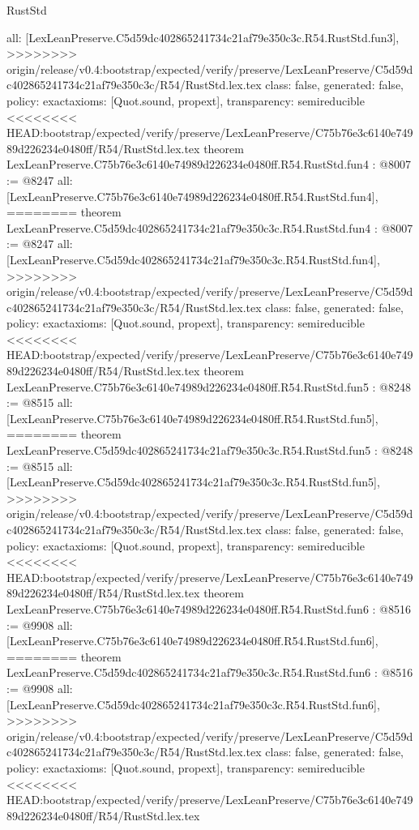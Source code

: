 \begin{lexlean}{RustStd}
\begin{coremodule}
{\begin{coremodule}
{{{{{{{  all: [LexLeanPreserve.C5d59dc402865241734c21af79e350c3c.R54.RustStd.fun3],
>>>>>>>> origin/release/v0.4:bootstrap/expected/verify/preserve/LexLeanPreserve/C5d59dc402865241734c21af79e350c3c/R54/RustStd.lex.tex
  class: false,
  generated: false,
  policy: exact{axioms: [Quot.sound, propext]},
  transparency: semireducible
}
<<<<<<<< HEAD:bootstrap/expected/verify/preserve/LexLeanPreserve/C75b76e3c6140e74989d226234e0480ff/R54/RustStd.lex.tex
theorem LexLeanPreserve.C75b76e3c6140e74989d226234e0480ff.R54.RustStd.fun4 : @8007 := @8247 {
  all: [LexLeanPreserve.C75b76e3c6140e74989d226234e0480ff.R54.RustStd.fun4],
========
theorem LexLeanPreserve.C5d59dc402865241734c21af79e350c3c.R54.RustStd.fun4 : @8007 := @8247 {
  all: [LexLeanPreserve.C5d59dc402865241734c21af79e350c3c.R54.RustStd.fun4],
>>>>>>>> origin/release/v0.4:bootstrap/expected/verify/preserve/LexLeanPreserve/C5d59dc402865241734c21af79e350c3c/R54/RustStd.lex.tex
  class: false,
  generated: false,
  policy: exact{axioms: [Quot.sound, propext]},
  transparency: semireducible
}
<<<<<<<< HEAD:bootstrap/expected/verify/preserve/LexLeanPreserve/C75b76e3c6140e74989d226234e0480ff/R54/RustStd.lex.tex
theorem LexLeanPreserve.C75b76e3c6140e74989d226234e0480ff.R54.RustStd.fun5 : @8248 := @8515 {
  all: [LexLeanPreserve.C75b76e3c6140e74989d226234e0480ff.R54.RustStd.fun5],
========
theorem LexLeanPreserve.C5d59dc402865241734c21af79e350c3c.R54.RustStd.fun5 : @8248 := @8515 {
  all: [LexLeanPreserve.C5d59dc402865241734c21af79e350c3c.R54.RustStd.fun5],
>>>>>>>> origin/release/v0.4:bootstrap/expected/verify/preserve/LexLeanPreserve/C5d59dc402865241734c21af79e350c3c/R54/RustStd.lex.tex
  class: false,
  generated: false,
  policy: exact{axioms: [Quot.sound, propext]},
  transparency: semireducible
}
<<<<<<<< HEAD:bootstrap/expected/verify/preserve/LexLeanPreserve/C75b76e3c6140e74989d226234e0480ff/R54/RustStd.lex.tex
theorem LexLeanPreserve.C75b76e3c6140e74989d226234e0480ff.R54.RustStd.fun6 : @8516 := @9908 {
  all: [LexLeanPreserve.C75b76e3c6140e74989d226234e0480ff.R54.RustStd.fun6],
========
theorem LexLeanPreserve.C5d59dc402865241734c21af79e350c3c.R54.RustStd.fun6 : @8516 := @9908 {
  all: [LexLeanPreserve.C5d59dc402865241734c21af79e350c3c.R54.RustStd.fun6],
>>>>>>>> origin/release/v0.4:bootstrap/expected/verify/preserve/LexLeanPreserve/C5d59dc402865241734c21af79e350c3c/R54/RustStd.lex.tex
  class: false,
  generated: false,
  policy: exact{axioms: [Quot.sound, propext]},
  transparency: semireducible
}
<<<<<<<< HEAD:bootstrap/expected/verify/preserve/LexLeanPreserve/C75b76e3c6140e74989d226234e0480ff/R54/RustStd.lex.tex
}}}}}}}}}
\end{coremodule}}
\end{coremodule}
\end{lexlean}
